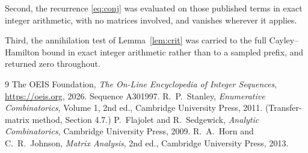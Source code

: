 \documentclass[11pt,a4paper]{article}
\theoremstyle{plain}
\theoremstyle{definition}
\begin{document}
Second, the recurrence \eqref{eq:conj} was evaluated on those published terms in exact
integer arithmetic, with no matrices involved, and vanishes wherever it applies.

Third, the annihilation test of Lemma~\ref{lem:crit} was carried to the full
Cayley--Hamilton bound in exact integer arithmetic rather than to a sampled prefix, and
returned zero throughout.

\begin{thebibliography}{9}
 The OEIS Foundation, \emph{The On-Line Encyclopedia of Integer
Sequences}, \url{https://oeis.org}, 2026. Sequence A301997.
 R.~P.~Stanley, \emph{Enumerative Combinatorics}, Volume 1, 2nd ed.,
Cambridge University Press, 2011. (Transfer-matrix method, Section 4.7.)
 P.~Flajolet and R.~Sedgewick, \emph{Analytic Combinatorics}, Cambridge
University Press, 2009.
 R.~A.~Horn and C.~R.~Johnson, \emph{Matrix Analysis}, 2nd ed., Cambridge
University Press, 2013.
\end{thebibliography}
\end{document}
